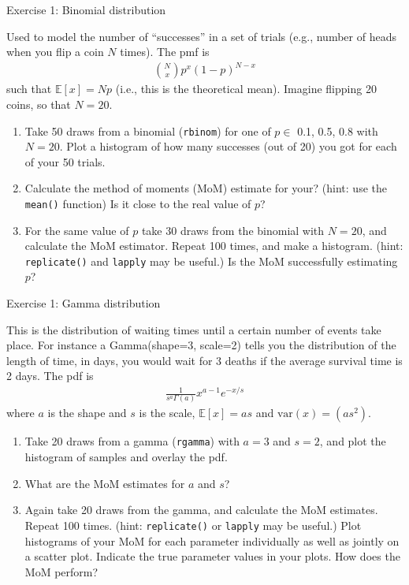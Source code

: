 \documentclass[12pt,xcolor=svgnames]{beamer}
\newcommand{\rd}{\color{red}}
\newcommand{\bl}{\color{blue}}
\newcommand{\theme}{\color{FireBrick}}
\newcommand{\ds}[1]{\mathds{#1}}
\newcommand{\sk}{\vspace{.4cm}}
\newcommand{\nochap}{\vspace{0.5cm}}
\newcommand{\chap}[1]{{\theme \Large \bf #1} \sk}
\newcommand{\E}{\ds{E}}
\newcommand{\var}{\text{var}}
\begin{document}
\begin{frame}
\nochap
{\bl Exercise 1: Binomial distribution}\\
{\scriptsize
Used to model the number of ``successes'' in a set of trials (e.g., number of heads when you flip a coin $N$ times). The pmf is 
\begin{align*}
{N \choose x} p^x(1-p)^{N-x}
\end{align*}
such that $\E[x]=Np$ (i.e., this is the theoretical mean). Imagine flipping 20 coins, so that $N=20$.
\begin{enumerate}
\item Take 50 draws from a binomial ({\bl \tt rbinom}) for one of $p\in $ 0.1, 0.5, 0.8 with $N=20$. Plot a histogram of how many successes (out of 20) you got for each of your 50 trials.
\item Calculate the method of moments (MoM) estimate for your? (hint: use the {\tt mean()} function) Is it close to the real value of $p$?
\item For the same value of $p$ take 30 draws from the binomial with $N=20$, and calculate the MoM estimator. Repeat 100 times, and make a histogram. (hint: {\tt replicate()} and {\tt lapply} may be useful.) Is the MoM successfully estimating $p$?
\end{enumerate}
}

\end{frame}


\begin{frame}
\nochap
{\bl Exercise 1: Gamma distribution}\\
{\scriptsize
This is the distribution of waiting times until a certain number of events take place. For instance a Gamma(shape=3, scale=2) tells you the distribution of the length of time, in days, you would wait for 3 deaths if the average survival time is 2 days. The pdf is 
\begin{align*}
\frac{1}{s^a\Gamma(a)}x^{a-1}e^{-x/s}
\end{align*}
where $a$ is the shape and $s$ is the scale, $\E[x]=as$ and $\var(x)=(as^2)$. 
\begin{enumerate}
\item Take 20 draws from a gamma ({\bl \tt rgamma}) with $a=3$ and $s=2$, and plot the histogram of samples and overlay the pdf.
\item What are the MoM estimates for $a$ and $s$?
\item Again take 20 draws from the gamma, and calculate the MoM estimates. Repeat 100 times. (hint: {\tt replicate()} or {\tt lapply} may be useful.) Plot histograms of your MoM for each parameter individually as well as jointly on a scatter plot. Indicate the true parameter values in your plots. How does the MoM perform?
\end{enumerate}
}

\end{frame}
\end{document}
